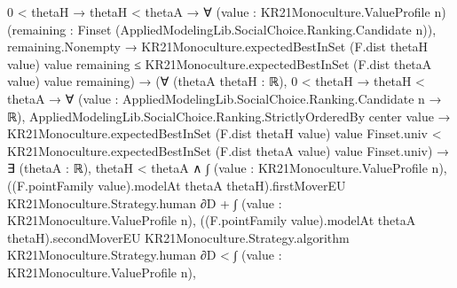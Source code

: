 \documentclass[10pt]{article}
\begin{document}
\begin{ReviewVerbatim}
                                              0 < thetaH →
                                                thetaH < thetaA →
                                                  ∀ (value : KR21Monoculture.ValueProfile n)
                                                    (remaining :
                                                      Finset (AppliedModelingLib.SocialChoice.Ranking.Candidate n)),
                                                    remaining.Nonempty →
                                                      KR21Monoculture.expectedBestInSet (F.dist thetaH value) value
                                                          remaining ≤
                                                        KR21Monoculture.expectedBestInSet (F.dist thetaA value) value
                                                          remaining) →
                                            (∀ (thetaA thetaH : ℝ),
                                                0 < thetaH →
                                                  thetaH < thetaA →
                                                    ∀ (value : AppliedModelingLib.SocialChoice.Ranking.Candidate n → ℝ),
                                                      AppliedModelingLib.SocialChoice.Ranking.StrictlyOrderedBy center
                                                          value →
                                                        KR21Monoculture.expectedBestInSet (F.dist thetaH value) value
                                                            Finset.univ <
                                                          KR21Monoculture.expectedBestInSet (F.dist thetaA value) value
                                                            Finset.univ) →
                                              ∃ (thetaA : ℝ),
                                                thetaH < thetaA ∧
                                                  ∫ (value : KR21Monoculture.ValueProfile n),
                                                          ((F.pointFamily value).modelAt thetaA thetaH).firstMoverEU
                                                            KR21Monoculture.Strategy.human ∂D +
                                                        ∫ (value : KR21Monoculture.ValueProfile n),
                                                          ((F.pointFamily value).modelAt thetaA thetaH).secondMoverEU
                                                            KR21Monoculture.Strategy.algorithm
                                                            KR21Monoculture.Strategy.human ∂D <
                                                      ∫ (value : KR21Monoculture.ValueProfile n),

\end{ReviewVerbatim}
\end{document}
